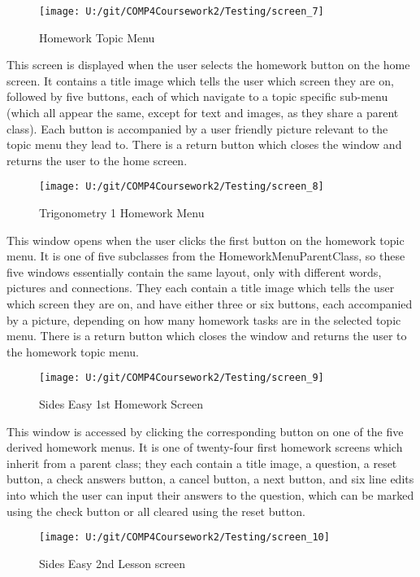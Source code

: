 \begin{figure}[H]
    \label{fig: Second Screen}\caption{Homework Topic Menu}
    \texttt{[image: U:/git/COMP4Coursework2/Testing/screen\_7]}
\end{figure}

This screen is displayed when the user selects the homework button on the home screen. It contains a title image which tells the user which screen they are on, followed by five buttons, each of which navigate to a topic specific sub-menu (which all appear the same, except for text and images, as they share a parent class). Each button is accompanied by a user friendly picture relevant to the topic menu they lead to. There is a return button which closes the window and returns the user to the home screen.

\begin{figure}[H]
    \label{fig: Second Screen}\caption{Trigonometry 1 Homework Menu}
    \texttt{[image: U:/git/COMP4Coursework2/Testing/screen\_8]}
\end{figure}

This window opens when the user clicks the first button on the homework topic menu. It is one of five subclasses from the HomeworkMenuParentClass, so these five windows essentially contain the same layout, only with different words, pictures and connections. They each contain a title image which tells the user which screen they are on, and have either three or six buttons, each accompanied by a picture, depending on how many homework tasks are in the selected topic menu. There is a return button which closes the window and returns the user to the homework topic menu.

\begin{figure}[H]
    \label{fig: Second Screen}\caption{Sides Easy 1st Homework Screen}
    \texttt{[image: U:/git/COMP4Coursework2/Testing/screen\_9]}
\end{figure}

This window is accessed by clicking the corresponding button on one of the five derived homework menus. It is one of twenty-four first homework screens which inherit from a parent class; they each contain a title image, a question, a reset button, a check answers button, a cancel button, a next button, and six line edits into which the user can input their answers to the question, which can be marked using the check button or all cleared using the reset button. 

\begin{figure}[H]
    \label{fig: Second Screen}\caption{Sides Easy 2nd Lesson screen}
    \texttt{[image: U:/git/COMP4Coursework2/Testing/screen\_10]}
\end{figure}

